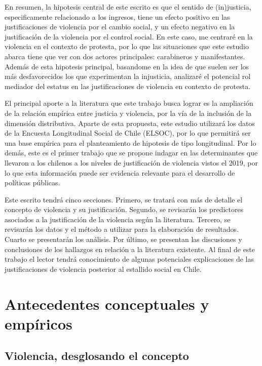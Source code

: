 \documentclass[12pt,twoside]{templates/facsothesis}
\begin{document}
En resumen, la hipotesis central de este escrito es que el sentido de (in)justicia, especificamente relacionado a los ingresos, tiene un efecto positivo en las justificaciones de violencia por el cambio social, y un efecto negativo en la justificación de la violencia por el control social. En este caso, me centraré en la violencia en el contexto de protesta, por lo que las situaciones que este estudio abarca tiene que ver con dos actores principales: carabineros y manifestantes. Además de esta hipotesis principal, basandome en la idea de que suelen ser los más desfavorecidos los que experimentan la injusticia, analizaré el potencial rol mediador del estatus en las justificaciones de violencia en contexto de protesta.

El principal aporte a la literatura que este trabajo busca lograr es la ampliación de la relación empírica entre justicia y violencia, por la vía de la inclusión de la dimensión distributiva. Aparte de esta propuesta, este estudio utilizará los datos de la Encuesta Longitudinal Social de Chile (ELSOC), por lo que permitirá ser una base empírica para el planteamiento de hipotesis de tipo longitudinal. Por lo demás, este es el primer trabajo que se propone indagar en las determinantes que llevaron a los chilenos a los niveles de justificación de violencia vistos el 2019, por lo que esta información puede ser evidencia relevante para el desarrollo de políticas públicas.

Este escrito tendrá cinco secciones. Primero, se tratará con más de detalle el concepto de violencia y su justificación. Segundo, se revisarán los predictores asociados a la justificación de la violencia según la literatura. Tercero, se revisarán los datos y el método a utilizar para la elaboración de resultados. Cuarto se presentarán los análisis. Por último, se presentan las discusiones y conclusiones de los hallazgos en relación a la literatura existente. Al final de este trabajo el lector tendrá conocimiento de algunas potenciales explicaciones de las justificaciones de violencia posterior al estallido social en Chile.

\hypertarget{antecedentes-conceptuales-y-empuxedricos}{%
\chapter{Antecedentes conceptuales y empíricos}\label{antecedentes-conceptuales-y-empuxedricos}}

\hypertarget{violencia-desglosando-el-concepto}{%
\section{Violencia, desglosando el concepto}\label{violencia-desglosando-el-concepto}}
\end{document}
